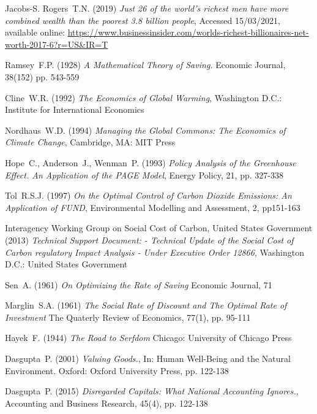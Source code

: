 \documentclass[11pt, oneside]{article}   	%
\begin{document}
\begin{thebibliography}{99}
 Jacobs-S. Rogers~T.N. (2019)
\emph{Just 26 of the world's richest men have more combined wealth than the poorest 3.8 billion people},
Accessed 15/03/2021, available online: 
\url{https://www.businessinsider.com/worlds-richest-billionaires-net-worth-2017-6?r=US&IR=T}
		
 Ramsey~F.P. (1928)
\emph{A Mathematical Theory of Saving.}
Economic Journal, 38(152) pp. 543-559
		
 Cline~W.R. (1992)
\emph{The Economics of Global Warming},
Washington D.C.: Institute for International Economics
		
 Nordhaus~W.D. (1994)
\emph{Managing the Global Commons: The Economics of Climate Change},
Cambridge, MA: MIT Press
		
 Hope~C., Anderson~J., Wenman~P. (1993)
\emph{Policy Analysis of the Greenhouse Effect. An Application of the PAGE Model},
Energy Policy, 21, pp. 327-338
		
 Tol~R.S.J. (1997)
\emph{On the Optimal Control of Carbon Dioxide Emissions: An Application of FUND},
Environmental Modelling and Assessment, 2, pp151-163
		
 Interagency Working Group on Social Cost of Carbon, United States Government (2013)
\emph{Technical Support Document: - Technical Update of the Social Cost of Carbon regulatory Impact Analysis - Under Executive Order 12866},
Washington D.C.: United States Government
		
 Sen~A. (1961)
\emph{On Optimizing the Rate of Saving}
Economic Journal, 71
		
 Marglin~S.A. (1961)
\emph{The Social Rate of Discount and The Optimal Rate of Investment}
The Quaterly Review of Economics, 77(1), pp. 95-111
		
 Hayek~F. (1944)
\emph{The Road to Serfdom}
Chicago: University of Chicago Press
		
 Dasgupta~P. (2001)
\emph{Valuing Goods.},
In: Human Well-Being and the Natural Environment. Oxford: Oxford University Press, pp. 122-138
		
 Dasgupta~P. (2015)
\emph{Disregarded Capitals: What National Accounting Ignores.},
Accounting and Business Research, 45(4), pp. 122-138
	
\end{thebibliography}
\end{document}
